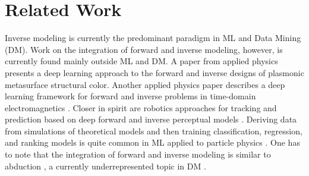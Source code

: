 \section{Related Work}
Inverse modeling is currently the predominant paradigm in ML and Data Mining (DM). 
Work on the integration of forward and inverse modeling, however, %
is currently found mainly outside ML and DM. A paper from applied physics  \cite{RobertsHedayati2021}  presents a deep learning approach to the forward and inverse designs of plasmonic metasurface structural color. Another applied physics paper  describes a deep learning framework for forward and inverse problems in time-domain electromagnetics \cite{Huetal2021}. 
Closer in spirit are robotics approaches for tracking and prediction based on deep forward and inverse perceptual models \cite{Lambertetal2018}. Deriving data from simulations of theoretical models and then training classification, regression, and ranking models is quite common in ML applied to particle physics \cite{Koeppeletal2021}. One has to note that the integration of forward and inverse modeling is similar to abduction \cite{Kakas2017}, a currently underrepresented topic in DM \cite{Wickeretal2015}.

